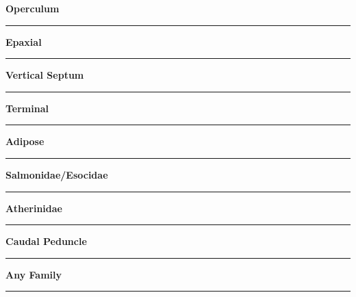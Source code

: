 \documentclass[11pt]{exam}
\newcommand*\Matching[1]{
\ifprintanswers
	\textbf{#1}
\else
	\rule{2.1in}{0.4pt}
\fi
}
\newlength\matchlena
\newlength\matchlenb
\newcommand\MatchQuestion[2]{%
	\setlength\matchlenb{\linewidth}
	\addtolength\matchlenb{-\matchlena}
	\parbox[t]{\matchlena}{\Matching{#1}}\enspace\parbox[t]{\matchlenb}{#2}}
\begin{document}
\begin{questions}
\begin{multicols}{2}
\question\MatchQuestion{Operculum}{}
\vspace{2\baselineskip}

\question\MatchQuestion{Epaxial}{}
\vspace{2\baselineskip}
%
\question\MatchQuestion{Vertical Septum}{}
\vspace{2\baselineskip}

\question\MatchQuestion{Terminal}{}
\vspace{2\baselineskip}

\question\MatchQuestion{Adipose}{}
\vspace{2\baselineskip}

\question[\textsc{ec}]\MatchQuestion{Salmonidae/Esocidae}{}
\vspace{2\baselineskip}

\question\MatchQuestion{Atherinidae}{}
\vspace{2\baselineskip}

\question\MatchQuestion{Caudal Peduncle}{}
\vspace{2\baselineskip}


\question[\textsc{ec}]\MatchQuestion{Any Family}{}
\vspace{2\baselineskip}

\end{multicols}

\end{questions}
\end{document}
